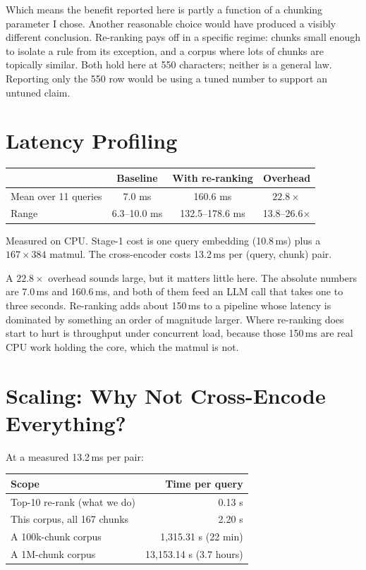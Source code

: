 \documentclass[11pt,a4paper]{article}
\begin{document}
Which means the benefit reported here is partly a function of a chunking parameter I chose.
Another reasonable choice would have produced a visibly different conclusion. Re-ranking pays
off in a specific regime: chunks small enough to isolate a rule from its exception, and a
corpus where lots of chunks are topically similar. Both hold here at 550 characters; neither
is a general law. Reporting only the 550 row would be using a tuned number to support an
untuned claim.

\section{Latency Profiling}

\begin{tabular}{lccc}
\toprule
& Baseline & With re-ranking & Overhead \\
\midrule
Mean over 11 queries & 7.0 ms & 160.6 ms & $22.8\times$ \\
Range                & 6.3--10.0 ms & 132.5--178.6 ms & 13.8--26.6$\times$ \\
\bottomrule
\end{tabular}

\medskip
Measured on CPU. Stage-1 cost is one query embedding (10.8\,ms) plus a $167 \times 384$
matmul. The cross-encoder costs 13.2\,ms per (query, chunk) pair.

A $22.8\times$ overhead sounds large, but it matters little here. The absolute numbers are
7.0\,ms and 160.6\,ms, and both of them feed an LLM call that takes one to three seconds.
Re-ranking adds about 150\,ms to a pipeline whose latency is dominated by something an order
of magnitude larger. Where re-ranking does start to
hurt is throughput under concurrent load, because those 150\,ms are real CPU work holding the
core, which the matmul is not.

\section{Scaling: Why Not Cross-Encode Everything?}

At a measured 13.2\,ms per pair:

\begin{tabular}{lr}
\toprule
Scope & Time per query \\
\midrule
Top-10 re-rank (what we do) & 0.13 s \\
This corpus, all 167 chunks & 2.20 s \\
A 100k-chunk corpus         & 1{,}315.31 s (22 min) \\
A 1M-chunk corpus           & 13{,}153.14 s (3.7 hours) \\
\bottomrule
\end{tabular}
\end{document}
